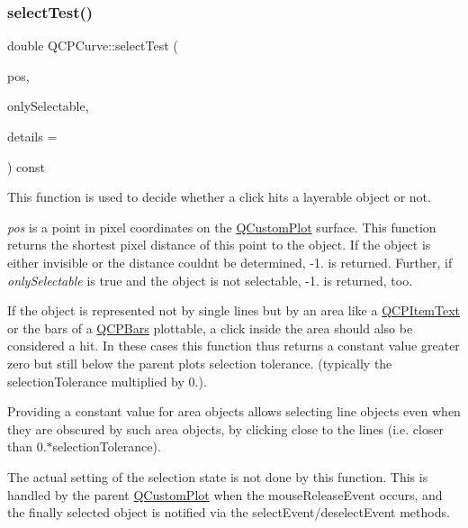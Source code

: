 \mbox{\label{class_q_c_p_curve_a87a9fb34a2a48dcae4c1245ada235e7d}} 
\subsubsection{\texorpdfstring{select\+Test()}{selectTest()}}
{\footnotesize\ttfamily double Q\+C\+P\+Curve\+::select\+Test (\begin{DoxyParamCaption}\item[{const Q\+PointF \&}]{pos,  }\item[{bool}]{only\+Selectable,  }\item[{Q\+Variant $\ast$}]{details = {} }\end{DoxyParamCaption}) const\hspace{0.3cm}{\ttfamily [virtual]}}

This function is used to decide whether a click hits a layerable object or not.

{\itshape pos} is a point in pixel coordinates on the \hyperlink{class_q_custom_plot}{Q\+Custom\+Plot} surface. This function returns the shortest pixel distance of this point to the object. If the object is either invisible or the distance couldn\textquotesingle{}t be determined, -\/1. is returned. Further, if {\itshape only\+Selectable} is true and the object is not selectable, -\/1. is returned, too.

If the object is represented not by single lines but by an area like a \hyperlink{class_q_c_p_item_text}{Q\+C\+P\+Item\+Text} or the bars of a \hyperlink{class_q_c_p_bars}{Q\+C\+P\+Bars} plottable, a click inside the area should also be considered a hit. In these cases this function thus returns a constant value greater zero but still below the parent plot\textquotesingle{}s selection tolerance. (typically the selection\+Tolerance multiplied by 0.).

Providing a constant value for area objects allows selecting line objects even when they are obscured by such area objects, by clicking close to the lines (i.\+e. closer than 0.$\ast$selection\+Tolerance).

The actual setting of the selection state is not done by this function. This is handled by the parent \hyperlink{class_q_custom_plot}{Q\+Custom\+Plot} when the mouse\+Release\+Event occurs, and the finally selected object is notified via the select\+Event/deselect\+Event methods.


